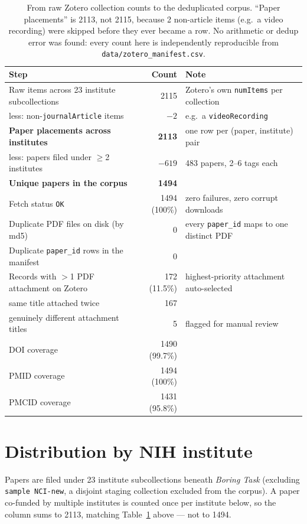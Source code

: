 \documentclass[11pt]{article}
\begin{document}
\begin{table}[h]
\centering
\begin{tabular}{lrl}
\toprule
Step & Count & Note \\
\midrule
Raw items across 23 institute subcollections & 2115 & Zotero's own \texttt{numItems} per collection \\
\quad less: non-\texttt{journalArticle} items & $-2$ & e.g.\ a \texttt{videoRecording} \\
\textbf{Paper placements across institutes} & \textbf{2113} & one row per (paper, institute) pair \\
\quad less: papers filed under $\geq$2 institutes & $-619$ & 483 papers, 2--6 tags each \\
\textbf{Unique papers in the corpus} & \textbf{1494} & \\
\midrule
Fetch status \texttt{OK} & 1494 (100\%) & zero failures, zero corrupt downloads \\
Duplicate PDF files on disk (by md5) & 0 & every \texttt{paper\_id} maps to one distinct PDF \\
Duplicate \texttt{paper\_id} rows in the manifest & 0 & \\
\midrule
Records with $>$1 PDF attachment on Zotero & 172 (11.5\%) & highest-priority attachment auto-selected \\
\quad same title attached twice & 167 & \\
\quad genuinely different attachment titles & 5 & flagged for manual review \\
\midrule
DOI coverage & 1490 (99.7\%) & \\
PMID coverage & 1494 (100\%) & \\
PMCID coverage & 1431 (95.8\%) & \\
\bottomrule
\end{tabular}
\caption{From raw Zotero collection counts to the deduplicated corpus. ``Paper placements'' is 2113,
not 2115, because 2 non-article items (e.g.\ a video recording) were skipped before they ever became a
row. No arithmetic or dedup error was found: every count here is independently reproducible from
\texttt{data/zotero\_manifest.csv}.}
\label{tab:reconcile}
\end{table}

\section{Distribution by NIH institute}

Papers are filed under 23 institute subcollections beneath \emph{Boring Task} (excluding
\texttt{sample NCI-new}, a disjoint staging collection excluded from the corpus). A paper co-funded by
multiple institutes is counted once per institute below, so the column sums to 2113, matching
Table~\ref{tab:reconcile} above --- not to 1494.
\end{document}
